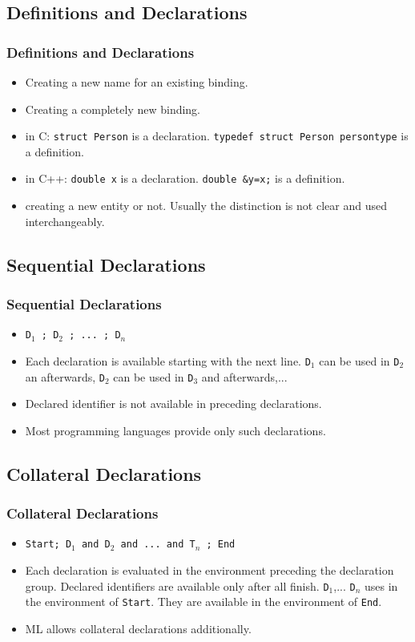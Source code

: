 \subsection{Definitions and Declarations}
\begin{frame}
\frametitle{Definitions and Declarations}
\begin{itemize}
 \item {} Creating a new name for an existing binding.
 \item {} Creating a completely new binding.
 \item in C: \texttt{struct Person} is a declaration. \texttt{typedef struct Person persontype}
 is a definition.
 \item in C++: \texttt{double x} is a declaration. \texttt{double \&y=x;} is a definition.
 \item creating a new entity or not. Usually the distinction is not clear and used
 interchangeably.
\end{itemize}
\end{frame}

\subsection{Sequential Declarations}
\begin{frame}
\frametitle{Sequential Declarations}
\begin{itemize}
 \item \texttt{D$_1$ ; D$_2$ ; ... ; D$_n$}
 \item Each declaration is available starting with the next line. \texttt{D$_1$} can be used in
 \texttt{D$_2$} an afterwards,  \texttt{D$_2$} can be used in \texttt{D$_3$} and afterwards,...
 \item Declared identifier is not available in preceding declarations.
 \item Most programming languages provide only such declarations.
\end{itemize}
\end{frame}

\subsection{Collateral Declarations}
\begin{frame}
\frametitle{Collateral Declarations}
\begin{itemize}
 \item \texttt{Start; D$_1$ and D$_2$ and ...  and T$_n$ ; End}
 \item Each declaration is evaluated in the environment preceding the declaration group.
 Declared identifiers are available only after all finish.
\texttt{D$_1$},... \texttt{D$_n$} uses in the environment of \texttt{Start}. They are 
available in the environment of \texttt{End}.
 \item ML allows collateral declarations additionally.
\end{itemize}
\end{frame}

